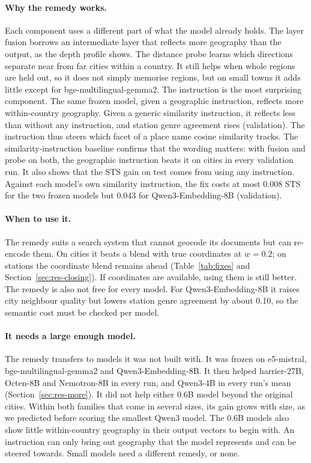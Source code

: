 \paragraph{Why the remedy works.}
Each component uses a different part of what the model already holds. The layer fusion borrows an intermediate layer that reflects more geography than the output, as the depth profile shows. The distance probe learns which directions separate near from far cities within a country. It still helps when whole regions are held out, so it does not simply memorise regions, but on small towns it adds little except for bge-multilingual-gemma2. The instruction is the most surprising component. The same frozen model, given a geographic instruction, reflects more within-country geography. Given a generic similarity instruction, it reflects less than without any instruction, and station genre agreement rises (validation). The instruction thus steers which facet of a place name cosine similarity tracks. The similarity-instruction baseline confirms that the wording matters: with fusion and probe on both, the geographic instruction beats it on cities in every validation run. It also shows that the STS gain on test comes from using any instruction. Against each model's own similarity instruction, the fix costs at most 0.008 STS for the two frozen models but 0.043 for Qwen3-Embedding-8B (validation).

\paragraph{When to use it.}
The remedy suits a search system that cannot geocode its documents but can re-encode them. On cities it beats a blend with true coordinates at $w=0.2$; on stations the coordinate blend remains ahead (Table~\ref{tab:fixes} and Section~\ref{sec:res-closing}). If coordinates are available, using them is still better. The remedy is also not free for every model. For Qwen3-Embedding-8B it raises city neighbour quality but lowers station genre agreement by about 0.10, so the semantic cost must be checked per model.

\paragraph{It needs a large enough model.}
The remedy transfers to models it was not built with. It was frozen on e5-mistral, bge-multilingual-gemma2 and Qwen3-Embedding-8B. It then helped harrier-27B, Octen-8B and Nemotron-8B in every run, and Qwen3-4B in every run's mean (Section~\ref{sec:res-more}). It did not help either 0.6B model beyond the original cities. Within both families that come in several sizes, its gain grows with size, as we predicted before scoring the smallest Qwen3 model. The 0.6B models also show little within-country geography in their output vectors to begin with. An instruction can only bring out geography that the model represents and can be steered towards. Small models need a different remedy, or none.

